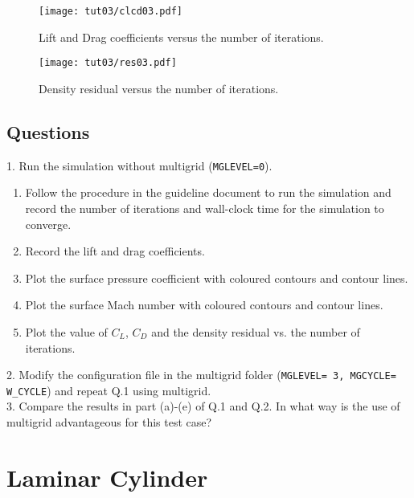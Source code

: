 \begin{figure}[ht]
    \centering
    \texttt{[image: tut03/clcd03.pdf]}
    \caption{Lift and Drag coefficients versus the number of iterations.}
    \label{fig3:clcdxlxs}
\end{figure}
\begin{figure}[H]
    \centering
    \texttt{[image: tut03/res03.pdf]}
    \caption{Density residual versus the number of iterations.}
    \label{fig3:res_vs_itr}
\end{figure}
\section*{Questions}
1. Run the simulation without multigrid (\texttt{MGLEVEL=0}).
\begin{enumerate}[label=(\alph*)]
    \item Follow the procedure in the guideline document to run the simulation and record the number of iterations and wall-clock time for the simulation to converge.
    \item Record the lift and drag coefficients.
    \item Plot the surface pressure coefficient with coloured contours and contour lines.
    \item Plot the surface Mach number with coloured contours and contour lines.
    \item Plot the value of $C_L$, $C_D$ and the density residual vs. the number of iterations.
\end{enumerate}
2. Modify the configuration file in the multigrid folder (\texttt{MGLEVEL= 3, MGCYCLE= W\_CYCLE}) and repeat Q.1 using multigrid.\\
3. Compare the results in part (a)-(e) of Q.1 and Q.2. In what way is the use of multigrid advantageous for this test case?\\
\chapter{Laminar Cylinder}
\label{ch:Laminar Cylinder}

